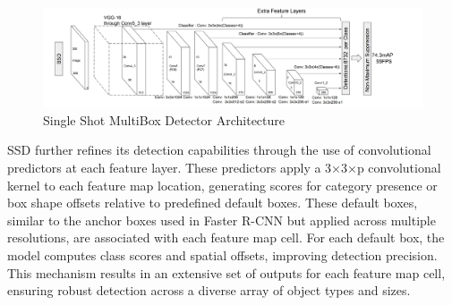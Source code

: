 \begin{figure}[h!]
    \centering
    \includegraphics[scale=0.55]{Figures/ssmbd.jpg}
    \caption{Single Shot MultiBox Detector Architecture \cite{ssd}}
    \label{fig:ssmd}
\end{figure}

SSD further refines its detection capabilities through the use of convolutional predictors at each feature layer. These predictors apply a 3×3×p 
convolutional kernel to each feature map location, generating scores for category presence or box shape offsets relative to predefined default boxes. 
These default boxes, similar to the anchor boxes used in Faster R-CNN but applied across multiple resolutions, are associated with each feature map cell. 
For each default box, the model computes class scores and spatial offsets, improving detection precision. This mechanism results in an extensive set of outputs 
for each feature map cell, ensuring robust detection across a diverse array of object types and sizes.





